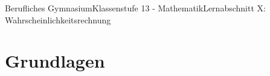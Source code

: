 \documentclass[11pt,twocolumn,oneside,openany,headings=optiontotoc,11pt,numbers=noenddot]{article}
\begin{document}
	\begin{worksheet}{Berufliches Gymnasium}{Klassenstufe 13 - Mathematik}{Lernabschnitt X: Wahrscheinlichkeitsrechnung}
		\section{Grundlagen}
	\end{worksheet}
\end{document}
